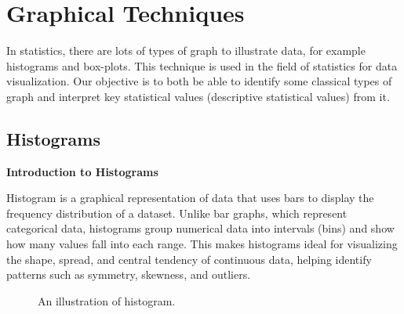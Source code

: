 \section{Graphical Techniques}

In statistics, there are lots of types of graph to illustrate data, for example histograms and box-plots. This technique is used in the field of statistics for data visualization. Our objective is to both be able to identify some classical types of graph and interpret key statistical values (descriptive statistical values) from it.

\subsection{Histograms}

\textbf{Introduction to Histograms}

\noindent
Histogram is a graphical representation of data that uses bars to display the frequency distribution of a dataset. Unlike bar graphs, which represent categorical data, histograms group numerical data into intervals (bins) and show how many values fall into each range. This makes histograms ideal for visualizing the shape, spread, and central tendency of continuous data, helping identify patterns such as symmetry, skewness, and outliers.\\

\begin{figure}[h]
\begin{center}
\end{center}
\caption{An illustration of histogram.}
\end{figure}

